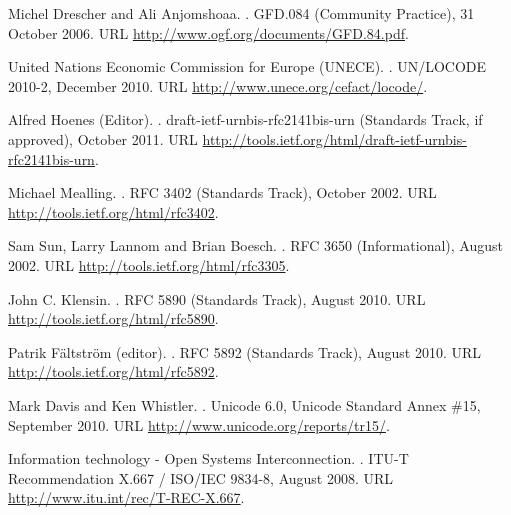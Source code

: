 \documentclass[12pt]{article}  %
\begin{document}
\begin{thebibliography}{10}
\vspace*{-3em}

Michel Drescher and Ali Anjomshoaa.
.
\newblock GFD.084 (Community Practice), 31 October 2006.
\newblock URL \url{http://www.ogf.org/documents/GFD.84.pdf}.

United Nations Economic Commission for Europe (UNECE).
.
\newblock UN/LOCODE 2010-2, December 2010.
\newblock URL \url{http://www.unece.org/cefact/locode/}.

Alfred Hoenes (Editor).
.
\newblock draft-ietf-urnbis-rfc2141bis-urn (Standards Track, if approved), October 2011.
\newblock URL \url{http://tools.ietf.org/html/draft-ietf-urnbis-rfc2141bis-urn}.


Michael Mealling.
.
\newblock RFC 3402 (Standards Track), October 2002.
\newblock URL \url{http://tools.ietf.org/html/rfc3402}.

Sam Sun, Larry Lannom and Brian Boesch.
.
\newblock RFC 3650 (Informational), August 2002.
\newblock URL \url{http://tools.ietf.org/html/rfc3305}.

John C. Klensin.
.
\newblock RFC 5890 (Standards Track), August 2010.
\newblock URL \url{http://tools.ietf.org/html/rfc5890}.

Patrik Fältström (editor).
.
\newblock RFC 5892 (Standards Track), August 2010.
\newblock URL \url{http://tools.ietf.org/html/rfc5892}.

Mark Davis and Ken Whistler.
.
\newblock Unicode 6.0, Unicode Standard Annex \#15, September 2010.
\newblock URL \url{http://www.unicode.org/reports/tr15/}.

Information technology - Open Systems Interconnection.
.
\newblock ITU-T Recommendation X.667 / ISO/IEC 9834-8, August 2008.
\newblock URL \url{http://www.itu.int/rec/T-REC-X.667}.

\end{thebibliography}
\end{document}
